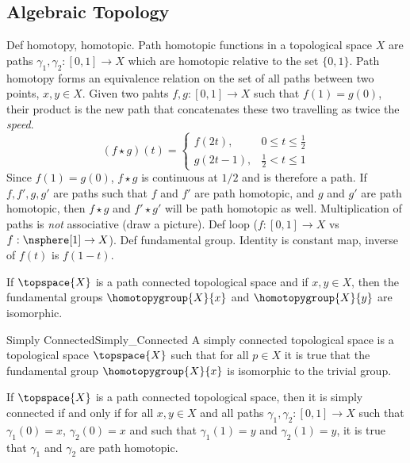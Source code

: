 \documentclass{article}                                                        %
\begin{document}
        \subsection{Algebraic Topology}
            Def homotopy, homotopic. Path homotopic functions in a topological
            space $X$ are paths $\gamma_{1},\gamma_{2}:[0,1]\rightarrow{X}$
            which are homotopic relative to the set $\{0,1\}$. Path homotopy
            forms an equivalence relation on the set of all paths between two
            points, $x,y\in{X}$. Given two pahts $f,g:[0,1]\rightarrow{X}$
            such that $f(1)=g(0)$, their product is the new path that
            concatenates these two travelling as twice the \textit{speed}.
            \begin{equation}
                (f\star{g})(t)=
                \begin{cases}
                    f(2t),&0\leq{t}\leq\frac{1}{2}\\
                    g(2t-1),&\frac{1}{2}<t\leq{1}
                \end{cases}
            \end{equation}
            Since $f(1)=g(0)$, $f\star{g}$ is continuous at $1/2$ and is
            therefore a path. If $f,f',g,g'$ are paths such that $f$ and $f'$
            are path homotopic, and $g$ and $g'$ are path homotopic, then
            $f\star{g}$ and $f'\star{g}'$ will be path homotopic as well.
            Multiplication of paths is \textit{not} associative
            (draw a picture). Def loop ($f:[0,1]\rightarrow{X}$ vs
            $f:\nsphere[1]\rightarrow{X}$). Def fundamental group. Identity is
            constant map, inverse of $f(t)$ is $f(1-t)$.
            \begin{theorem}
                If $\topspace{X}$ is a path connected topological space and if
                $x,y\in{X}$, then the fundamental groups $\homotopygroup{X}{x}$
                and $\homotopygroup{X}{y}$ are isomorphic.
            \end{theorem}
            \begin{fdefinition}{Simply Connected}{Simply_Connected}
                A simply connected topological space is a topological space
                $\topspace{X}$ such that for all $p\in{X}$ it is true that the
                fundamental group $\homotopygroup{X}{x}$ is isomorphic to the
                trivial group.
            \end{fdefinition}
            \begin{theorem}
                If $\topspace{X}$ is a path connected topological space, then
                it is simply connected if and only if for all $x,y\in{X}$ and
                all paths $\gamma_{1},\gamma_{2}:[0,1]\rightarrow{X}$ such that
                $\gamma_{1}(0)=x$, $\gamma_{2}(0)=x$ and such that
                $\gamma_{1}(1)=y$ and $\gamma_{2}(1)=y$, it is true that
                $\gamma_{1}$ and $\gamma_{2}$ are path homotopic.
            \end{theorem}
\end{document}
